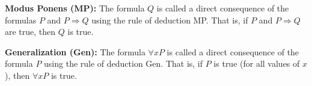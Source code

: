\textbf{Modus Ponens (MP):} The formula $Q$ is called a direct consequence of the formulas $P$ and $P \Rightarrow Q$ using the rule of deduction MP. That is, if $P$ and $P \Rightarrow Q$ are true, then $Q$ is true.

\textbf{Generalization (Gen):} The formula $\forall x P$ is called a direct consequence of the formula $P$ using the rule of deduction Gen. That is, if $P$ is true (for all values of $x$), then $\forall x P$ is true.
